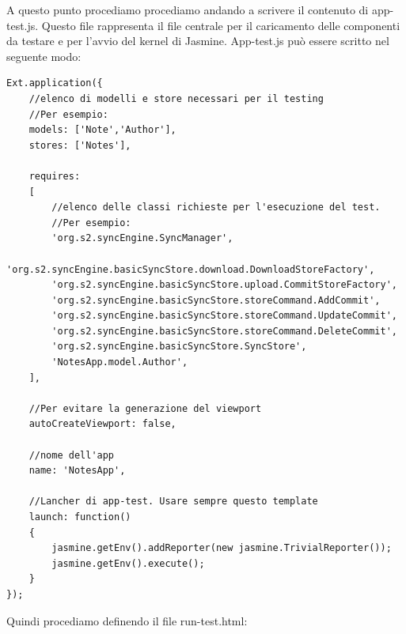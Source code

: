 \documentclass[10pt,a4paper,onecolumn]{article}
\begin{document}
A questo punto procediamo procediamo andando a scrivere il contenuto di app-test.js. Questo file rappresenta  il file centrale per il caricamento delle componenti da testare e per l'avvio del kernel di Jasmine. App-test.js può essere scritto nel seguente modo:

\begin{lstlisting}
Ext.application({
	//elenco di modelli e store necessari per il testing
	//Per esempio:
	models: ['Note','Author'],
	stores: ['Notes'],
	
	requires: 
	[
		//elenco delle classi richieste per l'esecuzione del test.
		//Per esempio:
		'org.s2.syncEngine.SyncManager',
		'org.s2.syncEngine.basicSyncStore.download.DownloadStoreFactory',
		'org.s2.syncEngine.basicSyncStore.upload.CommitStoreFactory',
		'org.s2.syncEngine.basicSyncStore.storeCommand.AddCommit',
		'org.s2.syncEngine.basicSyncStore.storeCommand.UpdateCommit',
		'org.s2.syncEngine.basicSyncStore.storeCommand.DeleteCommit',
		'org.s2.syncEngine.basicSyncStore.SyncStore',
		'NotesApp.model.Author',
	],
	
	//Per evitare la generazione del viewport
	autoCreateViewport: false,
	
	//nome dell'app
	name: 'NotesApp',
	
	//Lancher di app-test. Usare sempre questo template
	launch: function() 
	{
		jasmine.getEnv().addReporter(new jasmine.TrivialReporter());
		jasmine.getEnv().execute();
	}
});
\end{lstlisting}

Quindi procediamo definendo il file run-test.html:
\end{document}
